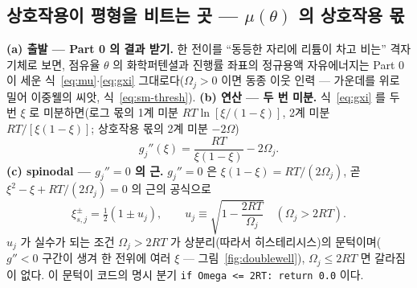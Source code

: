 \documentclass[11pt,a4paper]{article}
\newcommand{\code}[1]{\texttt{#1}}
\begin{document}
\subsection{상호작용이 평형을 비트는 곳 — $\mu(\theta)$ 의 상호작용 몫}
\textbf{(a) 출발 --- Part 0 의 결과 받기.} 한 전이를 ``동등한 자리에 리튬이 차고 비는'' 격자기체로 보면,
점유율 $\theta$ 의 화학퍼텐셜과 진행률 좌표의 정규용액 자유에너지는 Part 0 이 세운
식~\eqref{eq:mu}$\cdot$\eqref{eq:gxi} 그대로다($\Omega_j>0$ 이면 동종 이웃 인력 --- 가운데를 위로 밀어
이중웰의 씨앗, 식~\eqref{eq:sm-thresh}). \textbf{(b) 연산 --- 두 번 미분.}
식~\eqref{eq:gxi} 를 두 번 $\xi$ 로 미분하면(로그 몫의 1계 미분 $RT\ln[\xi/(1-\xi)]$, 2계 미분
$RT/[\xi(1-\xi)]$; 상호작용 몫의 2계 미분 $-2\Omega$)
\begin{equation}
g_j''(\xi)=\frac{RT}{\xi(1-\xi)}-2\Omega_j.
\label{eq:gpp}
\end{equation}
\textbf{(c) spinodal — $g_j''=0$ 의 근.} $g_j''=0$ 은 $\xi(1-\xi)=RT/(2\Omega_j)$, 곧 $\xi^2-\xi+RT/(2\Omega_j)=0$
의 근의 공식으로
\begin{equation}
\xi_{s,j}^\pm=\tfrac12(1\pm u_j),\qquad
u_j\equiv\sqrt{1-\frac{2RT}{\Omega_j}}\quad(\Omega_j>2RT).
\label{eq:spinodal}
\end{equation}
$u_j$ 가 실수가 되는 조건 $\Omega_j>2RT$ 가 상분리(따라서 히스테리시스)의 문턱이며($g''<0$ 구간이 생겨 한 전위에 여러
$\xi$ — 그림~\ref{fig:doublewell}), $\Omega_j\le2RT$ 면 갈라짐이 없다. 이 문턱이 코드의 명시 분기
\code{if Omega <= 2RT: return 0.0} 이다.
\end{document}
